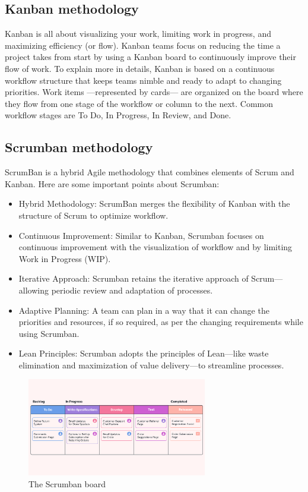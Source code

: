 \subsection{Kanban methodology}
Kanban is all about visualizing your work, limiting work in progress, and maximizing efficiency (or flow).
Kanban teams focus on reducing the time a project takes from start by using a Kanban board to continuously improve their flow of work.
To explain more in details, Kanban is based on a continuous workflow structure that keeps teams nimble and ready to adapt to changing priorities.
Work items —represented by cards— are organized on the board where they flow from one stage of the workflow or column to the next.
Common workflow stages are To Do, In Progress, In Review, and Done.

\subsection{Scrumban methodology}
ScrumBan is a hybrid Agile methodology that combines elements of Scrum and Kanban. Here are some important points about Scrumban:

\begin{itemize}
    \item Hybrid Methodology: ScrumBan merges the flexibility of Kanban with the structure of Scrum to optimize workflow.
    \item Continuous Improvement: Similar to Kanban, Scrumban focuses on continuous improvement with the visualization of workflow and by limiting Work in Progress (WIP).
    \item Iterative Approach: Scrumban retains the iterative approach of Scrum—allowing periodic review and adaptation of processes.
    \item Adaptive Planning: A team can plan in a way that it can change the priorities and resources, if so required, as per the changing requirements while using Scrumban.
    \item Lean Principles: Scrumban adopts the principles of Lean—like waste elimination and maximization of value delivery—to streamline processes.
\end{itemize}

\begin{figure}[H]
    \centering
    \includegraphics[width=0.7\textwidth]{src/assets/chapters/Scrumban.png}
    \caption{The Scrumban board}
    \label{fig:Scrumban_image}
\end{figure}


